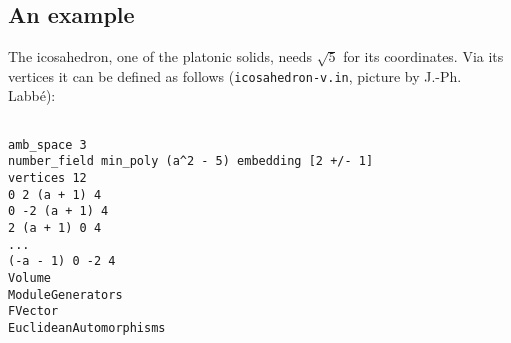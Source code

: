 \documentclass[12pt,a4paper]{scrartcl}
\theoremstyle{definition}
\begin{document}
{\subsection{An example}\label{alg_ex}

The icosahedron, one of the platonic solids, needs $\sqrt 5$ for its coordinates. Via its vertices it can be defined as follows (\verb|icosahedron-v.in|, picture by J.-Ph. Labbé):

\begin{minipage}[b]{0.5\textwidth}
\begin{verbatim}

amb_space 3
number_field min_poly (a^2 - 5) embedding [2 +/- 1]
vertices 12
0 2 (a + 1) 4
0 -2 (a + 1) 4
2 (a + 1) 0 4
...
(-a - 1) 0 -2 4
Volume
ModuleGenerators
FVector
EuclideanAutomorphisms


\end{verbatim}
\end{minipage}}
\end{document}
